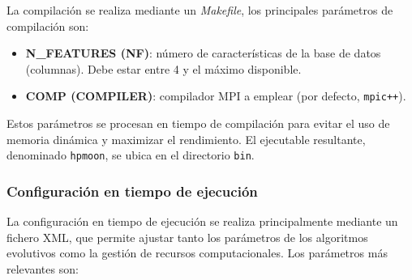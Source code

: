 La compilación se realiza mediante un \textit{Makefile}, los principales parámetros de compilación son:

\begin{itemize}
    \item \textbf{N\_FEATURES (NF)}: número de características de la base de datos (columnas). Debe estar entre 4 y el máximo disponible.
    \item \textbf{COMP (COMPILER)}: compilador MPI a emplear (por defecto, \texttt{mpic++}).
\end{itemize}

Estos parámetros se procesan en tiempo de compilación para evitar el uso de memoria dinámica y maximizar el rendimiento. El ejecutable resultante, denominado \texttt{hpmoon}, se ubica en el directorio \texttt{bin}.

\subsubsection{Configuración en tiempo de ejecución}

La configuración en tiempo de ejecución se realiza principalmente mediante un fichero XML, que permite ajustar tanto los parámetros de los algoritmos evolutivos como la gestión de recursos computacionales. Los parámetros más relevantes son:

